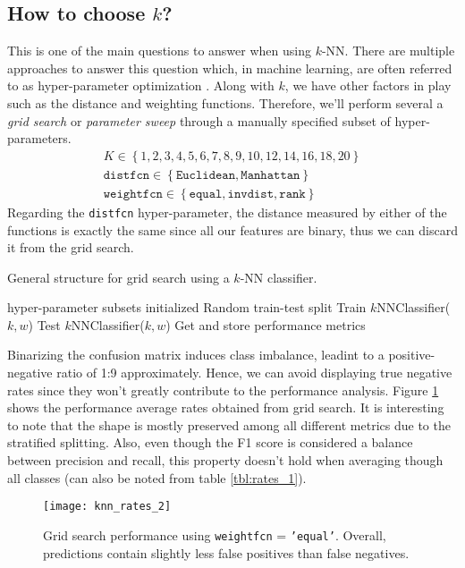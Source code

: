 \subsection{How to choose $k$?}
This is one of the main questions to answer when using $k$-NN. There are multiple approaches to answer this question which, in machine learning, are often referred to as hyper-parameter optimization \cite{hyperparameter-search}. Along with $k$, we have other factors in play such as the distance and weighting functions. Therefore, we'll perform several a \textit{grid search} or \textit{parameter sweep} through a manually specified subset of hyper-parameters.
\begin{gather*}
K \in \left\lbrace 1,2,3,4,5,6,7,8,9,10,12,14,16,18,20 \right\rbrace \\
\texttt{distfcn} \in \left\lbrace \texttt{Euclidean}, \texttt{Manhattan} \right\rbrace \\
\texttt{weightfcn} \in \left\lbrace \texttt{equal}, \texttt{invdist}, \texttt{rank} \right\rbrace
\end{gather*}
%
Regarding the \texttt{distfcn} hyper-parameter, the distance measured by either of the functions is exactly the same since all our features are binary, thus we can discard it from the grid search.
\begin{algorithm}
	\caption{General structure for grid search using a $k$-NN classifier.}
	\label{algo:perceptron}
	\begin{algorithmic}
		\Ensure hyper-parameter subsets initialized
				\State Random train-test split
				\State Train $k$NNClassifier($k, w$) 
				\State Test $k$NNClassifier($k, w$)
				\State Get and store performance metrics
				\EndFor
			\EndFor
		\EndFor
		\EndProcedure		
	\end{algorithmic}
\end{algorithm} 

Binarizing the confusion matrix induces class imbalance, leadint to a positive-negative ratio of 1:9 approximately. Hence, we can avoid displaying true negative rates since they won't greatly contribute to the performance analysis. Figure \ref{fig:knn_rates_2} shows the performance average rates obtained from grid search. It is interesting to note that the shape is mostly preserved among all different metrics due to the stratified splitting. Also, even though the F1 score is considered a balance between precision and recall, this property doesn't hold when averaging though all classes (can also be noted from table \ref{tbl:rates_1}).
\begin{figure}[]
	\centering
	\texttt{[image: knn\_rates\_2]}
	\caption{Grid search performance using \texttt{weightfcn} = \texttt{'equal'}. Overall, predictions contain slightly less false positives than false negatives.}
	\label{fig:knn_rates_2}
\end{figure}

